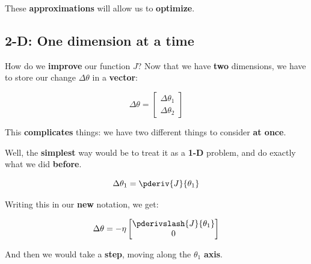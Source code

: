         These \textbf{approximations} will allow us to \textbf{optimize}.

    \subsection{2-D: One dimension at a time}
        
        How do we \textbf{improve} our function $J$? Now that we have \textbf{two} dimensions, we have to store our change $\Delta \theta$ in a \textbf{vector}:
        
        \begin{equation}
            \Delta \theta
            =
            \begin{bmatrix}
                  \Delta \theta_1 \\ \Delta \theta_2 
            \end{bmatrix}
        \end{equation}
        
        This \textbf{complicates} things: we have two different things to consider \textbf{at once}.
        
        Well, the \textbf{simplest} way would be to treat it as a \textbf{1-D} problem, and do exactly what we did \textbf{before}. 
        
        \begin{equation}
            \Delta \theta_1 = \pderiv{J}{\theta_1}
        \end{equation}
        
        Writing this in our \textbf{new} notation, we get:
        
        \begin{equation}
            \Delta \theta
            =
            - \eta 
            \begin{bmatrix}
                  \pderivslash{J}{\theta_1} \\ 0 
            \end{bmatrix}
        \end{equation}
        
        And then we would take a \textbf{step}, moving along the $\theta_1$ \textbf{axis}.
        
